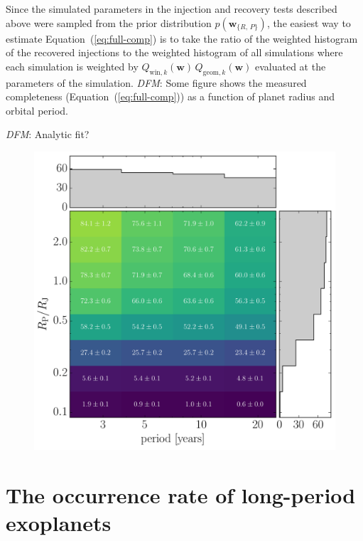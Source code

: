 \documentclass[manuscript, letterpaper]{aastex6}
\newcommand{\figlabel}[1]{\label{fig:#1}}
\renewcommand{\eqref}[1]{\ref{eq:#1}}
\newcommand{\Eq}[1]{Equation~(\eqref{#1})}
\newcommand{\eq}[1]{\Eq{#1}}
\newcommand{\bvec}[1]{{\ensuremath{\boldsymbol{#1}}}}
\newcommand{\todo}[3]{{\color{#2}\emph{#1}: #3}}
\newcommand{\dfmtodo}[1]{\todo{DFM}{red}{#1}}
\newcommand{\params}{{\ensuremath{\bvec{w}}}}
\begin{document}
Since the simulated parameters in the injection and recovery tests described
above were sampled from the prior distribution $p(\params_{\{R,\,P\}})$, the
easiest way to estimate \eq{full-comp} is to take the ratio of the weighted
histogram of the recovered injections to the weighted histogram of all
simulations where each simulation is weighted by
$Q_{\mathrm{win},k} (\params) \, Q_{\mathrm{geom},k} (\params)$ evaluated at
the parameters of the simulation.
\dfmtodo{Some figure} shows the measured completeness (\eq{full-comp}) as a
function of planet radius and orbital period.

\dfmtodo{Analytic fit?}

\begin{figure}
\vspace{\baselineskip}
\begin{center}
\includegraphics[width=\textwidth]{figures/completeness.pdf}
\end{center}
\caption{%
\figlabel{completeness}}
\end{figure}


\section{The occurrence rate of long-period exoplanets}
\end{document}
